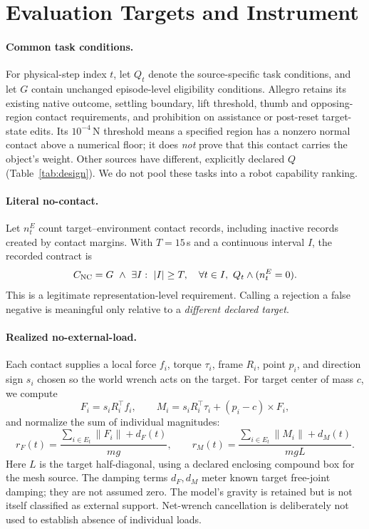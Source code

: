 \section{Evaluation Targets and Instrument}
\label{sec:contracts}
\paragraph{Common task conditions.}
For physical-step index $t$, let $Q_t$ denote the source-specific task
conditions, and let $G$ contain unchanged episode-level eligibility conditions.
Allegro retains its existing native outcome, settling boundary, lift threshold,
thumb and opposing-region contact requirements, and prohibition on assistance
or post-reset target-state edits. Its $10^{-4}$\,N threshold means a specified
region has a nonzero normal contact above a numerical floor; it does \emph{not}
prove that this contact carries the object's weight. Other sources have
different, explicitly declared $Q$ (Table~\ref{tab:design}). We do not pool these
tasks into a robot capability ranking.

\paragraph{Literal no-contact.}
Let $n_t^E$ count target--environment contact records, including inactive
records created by contact margins. With $T=15$\,s and a continuous interval
$I$, the recorded contract is
\begin{equation}
 \NC = G\ \wedge\ \exists I:\ |I|\ge T,\quad
 \forall t\in I,\ Q_t\wedge(n_t^E=0).
\end{equation}
This is a legitimate representation-level requirement. Calling a rejection a
false negative is meaningful only relative to a \emph{different declared target}.

\paragraph{Realized no-external-load.}
Each contact supplies a local force $f_i$, torque $\tau_i$, frame $R_i$, point
$p_i$, and direction sign $s_i$ chosen so the world wrench acts on the target.
For target center of mass $c$, we compute
\begin{equation}
 F_i=s_iR_i^\top f_i,\qquad
 M_i=s_iR_i^\top\tau_i+(p_i-c)\times F_i,
\end{equation}
and normalize the sum of individual magnitudes:
\begin{equation}
 r_F(t)=\frac{\sum_{i\in E_t}\|F_i\|+d_F(t)}{mg},\qquad
 r_M(t)=\frac{\sum_{i\in E_t}\|M_i\|+d_M(t)}{mgL}.
\label{eq:load}
\end{equation}
Here $L$ is the target half-diagonal, using a declared enclosing compound box
for the mesh source. The damping terms $d_F,d_M$ meter known target free-joint
damping; they are not assumed zero. The model's gravity is retained but is not
itself classified as external support. Net-wrench cancellation is deliberately
not used to establish absence of individual loads.

